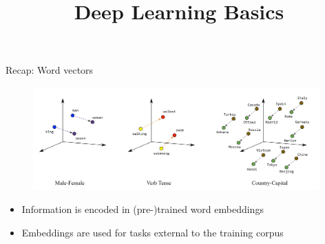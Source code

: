 



\newcommand{\titlefigure}{figure/elmo.jpg}
\newcommand{\learninggoals}{
\item Understand the contextualization of word embeddings
\item Get the intuition of feature-based Transfer Learning}

\title{Deep Learning Basics}
\date{}




\begin{vbframe}{Recap: Word vectors}

\vfill

	\begin{figure}
		\centering
		\includegraphics[width = 11cm]{figure/linear-relationships.png}\\ 
	\end{figure}

	\begin{itemize}
		\item Information is encoded in (pre-)trained word embeddings
		\item Embeddings are used for tasks external to the training corpus
	\end{itemize}

\vfill

\end{vbframe}



